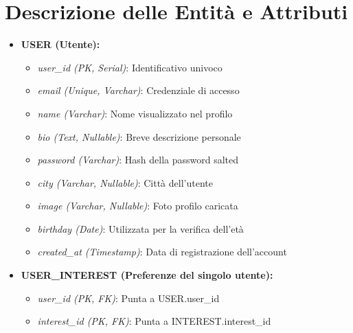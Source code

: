 \newcommand{\inputparam}[2]{%
  \def\parg{#2}
  
}

\inputparam{intestazione}{Modello E-R}


\newpage

\section{Descrizione delle Entità e Attributi}
    \begin{itemize}[nosep, leftmargin=*]
        \item\textbf{USER (Utente):}
        \begin{itemize}
            \item \textit{user\_id (PK, Serial)}: Identificativo univoco
            \item \textit{email (Unique, Varchar)}: Credenziale di accesso
            \item \textit{name (Varchar)}: Nome visualizzato nel profilo 
            \item \textit{bio (Text, Nullable)}: Breve descrizione personale 
            \item \textit{password (Varchar)}: Hash della password salted
            \item \textit{city (Varchar, Nullable)}: Città dell'utente
            \item \textit{image (Varchar, Nullable)}: Foto profilo caricata
            \item \textit{birthday (Date)}: Utilizzata per la verifica dell'età
            \item \textit{created\_at (Timestamp)}: Data di registrazione dell'account
        \end{itemize}

        \item \textbf{USER\_INTEREST (Preferenze del singolo utente):}
        \begin{itemize}
            \item \textit{user\_id (PK, FK)}: Punta a USER.user\_id
            \item \textit{interest\_id (PK, FK)}: Punta a INTEREST.interest\_id
        \end{itemize}
        

\end{itemize}
